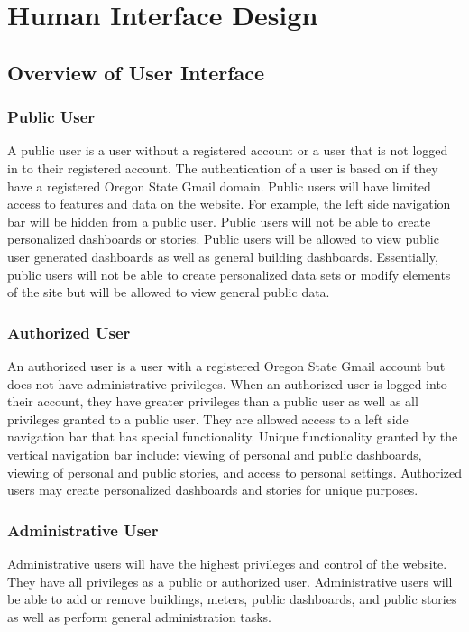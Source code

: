 \documentclass[journal,10pt,onecolumn,compsoc]{IEEEtran}
\begin{document}
	
	
	\section{Human Interface Design}
    \subsection{Overview of User Interface}
    
	\subsubsection{Public User}
	A public user is a user without a registered account or a user that is not logged in to their registered account. The authentication of a user is based on if 
	they have a registered Oregon State Gmail domain. Public users will have limited access to features and data on the website. For example, the left side navigation
	bar will be hidden from a public user. Public users will not be able to create personalized dashboards or stories. Public users will be allowed to view public 
	user generated dashboards as well as general building dashboards. Essentially, public users will not be able to create personalized data sets or modify elements of the site but will be 
	allowed to view general public data. 
	\subsubsection{Authorized User}
	An authorized user is a user with a registered Oregon State Gmail account but does not have administrative privileges. When an authorized user is logged into their account, 
	they have greater privileges than a public user as well as all privileges granted to a public user. They are allowed access to a left side navigation 
	bar that has special functionality. Unique functionality granted by the vertical navigation bar include: viewing of personal and public dashboards, viewing of personal and public
	stories, and access to personal settings. Authorized users may create personalized dashboards and stories for unique purposes.
	
	\subsubsection{Administrative User}
	Administrative users will have the highest privileges and control of the website. They have all privileges as a public or authorized user. Administrative users
	will be able to add or remove buildings, meters, public dashboards, and public stories as well as perform general administration tasks.
	
\end{document}
